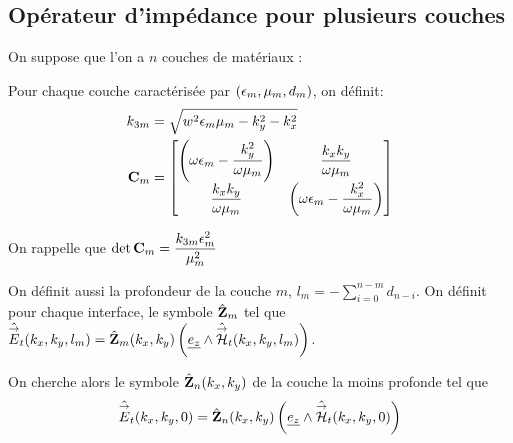 
    \subsection{Opérateur d'impédance pour plusieurs couches}
        On suppose que l'on a $n$ couches de matériaux : 

        \begin{figure}[h!btp]
            \centering
            \begin{tikzpicture}
                
            \end{tikzpicture}
        \end{figure}

        Pour chaque couche caractérisée par $(\eps_m,\mu_m,d_m)$, on définit:
        \begin{align}
        k_{3m} &= \sqrt{w^2\eps_m\mu_m - k_y^2 - k_x^2}
        \\
        \mC_m &=
            \begin{bmatrix}
                \left(\w\eps_m-\frac{k_y^2}{\w\mu_m}\right) & \frac{k_xk_y}{\w\mu_m}\\
                \frac{k_xk_y}{\w\mu_m} & \left(\w\eps_m-\frac{k_x^2}{\w\mu_m}\right)
            \end{bmatrix}
        \end{align}

        On rappelle que $\det{\mC_m} = \frac{k_{3m}\eps_m^2}{\mu_m^2}$

        On définit aussi la profondeur de la couche $m$, $l_m = -\sum_{i=0}^{n-m} d_{n-i} $. 
        On définit pour chaque interface, le symbole $\hat \mZ_m$ tel que $\hat \vE_t(k_x,k_y,l_m) = \hat \mZ_m(k_x,k_y) \left(\v{e_z} \pvect \hat \vH_t(k_x,k_y,l_m)\right)$. 

        On cherche alors le symbole $\hat \mZ_n(k_x,k_y)$  de la couche la moins profonde tel que 
        \begin{equation}
            \hat \vE_t(k_x,k_y,0) = \hat \mZ_n (k_x,k_y) \left(\v{e_z} \pvect \hat \vH_t(k_x,k_y,0)\right)
        \end{equation}

